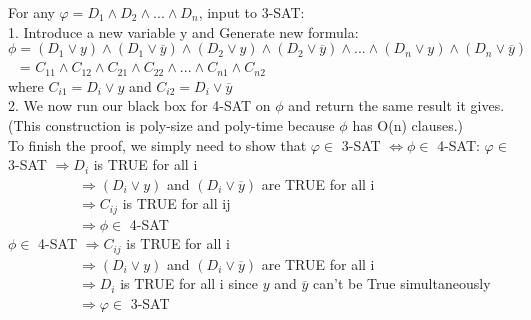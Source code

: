 \documentclass[12pt]{article}
\begin{document}
For any $\varphi = D_1 \wedge D_2 \wedge ... \wedge D_n$, input to 3-SAT:\\
1. Introduce a new variable y and Generate new formula:\\
$\phi = (D_1 \vee y) \wedge (D_1 \vee \overline{y}) \wedge(D_2 \vee y) \wedge (D_2 \vee \overline{y}) \wedge ... \wedge (D_n \vee y) \wedge (D_n \vee \overline{y}) $ \\
$\phantom{1}$ = $C_{11} \wedge C_{12} \wedge C_{21} \wedge C_{22} \wedge ... \wedge C_{n1} \wedge C_{n2}$\\
where $C_{i1} = D_i \vee y$ and $C_{i2} = D_i \vee \overline{y}$\\
2. We now run our black box for 4-SAT on $\phi$ and return the same result it gives. (This construction is poly-size and poly-time because $\phi$ has O(n) clauses.)\\


To finish the proof, we simply need to show that $\varphi \in $ 3-SAT  $ \Longleftrightarrow \phi \in $ 4-SAT:
$\varphi \in $ 3-SAT  $\Rightarrow D_i $ is TRUE for all i\\
$\phantom{1234567891} \Rightarrow  (D_i \vee y) $ and $(D_i \vee \overline{y}) $ are TRUE for all i\\
$\phantom{1234567891} \Rightarrow  C_{ij} $ is TRUE for all ij\\
$\phantom{1234567891} \Rightarrow \phi \in $ 4-SAT\\

$\phi \in $ 4-SAT  $\Rightarrow C_{ij} $ is TRUE for all i\\
$\phantom{1234567891} \Rightarrow  (D_i \vee y) $ and $(D_i \vee \overline{y}) $ are TRUE for all i\\
$\phantom{1234567891} \Rightarrow  D_{i} $ is TRUE for all i since $y$ and $\overline{y}$ can't be True simultaneously\\
$\phantom{1234567891} \Rightarrow \varphi \in $ 3-SAT
\end{document}

